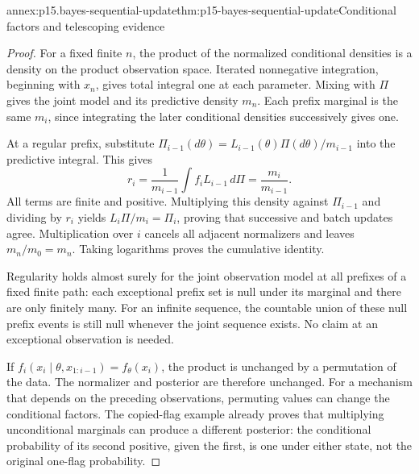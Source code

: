 \begin{annexitem}{annex:p15.bayes-sequential-update}{thm:p15-bayes-sequential-update}{Conditional factors and telescoping evidence}
\begin{proof}
For a fixed finite \(n\), the product of the normalized conditional
densities is a density on the product observation space. Iterated
nonnegative integration, beginning with \(x_n\), gives total integral
one at each parameter. Mixing with \(\Pi\) gives the joint model
and its predictive density \(m_n\). Each prefix marginal is the
same \(m_i\), since integrating the later conditional densities
successively gives one.

At a regular prefix, substitute
\(\Pi_{i-1}(d\theta)=L_{i-1}(\theta)\Pi(d\theta)/m_{i-1}\)
into the predictive integral. This gives
\[
 r_i=\frac{1}{m_{i-1}}\int f_iL_{i-1}\,d\Pi
     =\frac{m_i}{m_{i-1}}.
\]
All terms are finite and positive. Multiplying this density
against \(\Pi_{i-1}\) and dividing by \(r_i\) yields
\(L_i\Pi/m_i=\Pi_i\), proving that successive and batch
updates agree. Multiplication over \(i\) cancels all adjacent
normalizers and leaves \(m_n/m_0=m_n\). Taking logarithms
proves the cumulative identity.

Regularity holds almost surely for the joint observation model
at all prefixes of a fixed finite path: each exceptional prefix
set is null under its marginal and there are only finitely many.
For an infinite sequence, the countable union of these null
prefix events is still null whenever the joint sequence exists.
No claim at an exceptional observation is needed.

If \(f_i(x_i\mid\theta,x_{1:i-1})=f_\theta(x_i)\),
the product is unchanged by a permutation of the data.
The normalizer and posterior are therefore unchanged.
For a mechanism that depends on the preceding observations,
permuting values can change the conditional factors.
The copied-flag example already proves that multiplying
unconditional marginals can produce a different posterior:
the conditional probability of its second positive, given
the first, is one under either state, not the original
one-flag probability.
\end{proof}
\end{annexitem}

